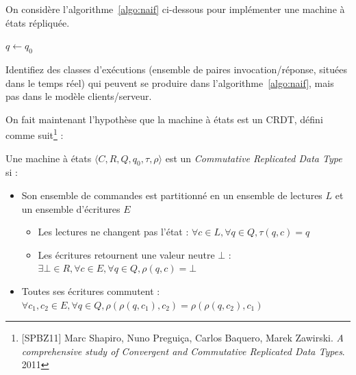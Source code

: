 
\begingroup


\begin{exercice}

  On considère l'algorithme~\ref{algo:naif} ci-dessous pour implémenter une machine à états répliquée.
  
  \begin{algorithm}
    $q \leftarrow q_0$\;
    \caption{Réplication de la machine à états $\langle C, R, Q, q_0, \tau, \rho \rangle$ (code pour $p_i$)}
    \label{algo:naif}
  \end{algorithm}

  \begin{questions}
  \item Identifiez des classes d'exécutions (ensemble de paires invocation/réponse, situées dans le temps réel)
  qui peuvent se produire dans l'algorithme~\ref{algo:naif}, mais pas dans le modèle clients/serveur. 
  \end{questions}

  On fait maintenant l'hypothèse que la machine à états est un CRDT, défini comme suit\footnote{[SPBZ11] Marc Shapiro, Nuno Preguiça, Carlos Baquero, Marek Zawirski. \emph{A comprehensive study of Convergent and Commutative Replicated Data Types}. 2011} :
  \begin{definition}[CRDT]
    Une machine à états $\langle C, R, Q, q_0, \tau, \rho \rangle$ est un \emph{Commutative Replicated Data Type} si : 
    \begin{itemize}
    \item Son ensemble de commandes est partitionné en un ensemble de lectures $L$ et un ensemble d'écritures $E$
      \begin{itemize}
      \item Les lectures ne changent pas l'état : $\forall c \in L, \forall q\in Q, \tau(q, c) = q$
      \item Les écritures retournent une valeur neutre $\bot$ :  $\exists \bot\in R, \forall c \in E, \forall q\in Q, \rho(q, c) = \bot$
      \end{itemize}
    \item Toutes ses écritures commutent : $\forall c_1, c_2 \in E, \forall q\in Q, \rho(\rho(q, c_1), c_2) = \rho(\rho(q, c_2), c_1)$
    \end{itemize}
  \end{definition}  


\end{exercice}
